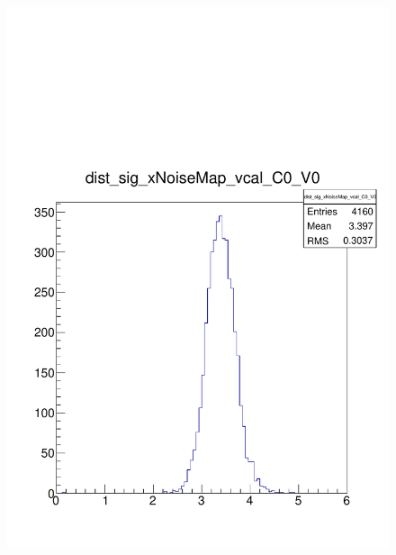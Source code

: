 \documentclass[a4paper,12pt,twoside]{article}
\begin{document}
\begin{figure} [h!]
\begin{minipage}{.48\textwidth}
  \includegraphics[width=\textwidth]{./Figures/HRSCurves_sigDist.pdf}
  \label{HRSCurves-sigDist}
\end{minipage}
\end{figure}
\end{document}
